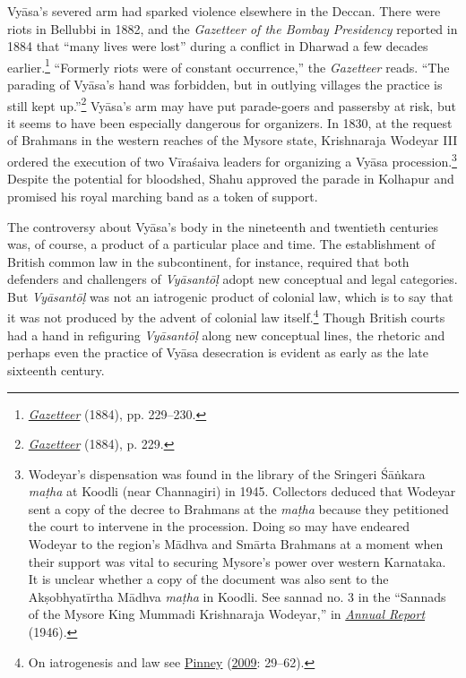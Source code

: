 Vyāsa’s severed arm had sparked violence elsewhere in the Deccan. There were riots in Bellubbi in 1882, and the \emph{Gazetteer of the Bombay Presidency} reported in 1884 that “many lives were lost” during a conflict in Dharwad a few decades earlier.\footnote{%
\hyperref[Gazetteer]{\emph{Gazetteer}} (1884), pp. 229–230.
}
 “Formerly riots were of constant occurrence,” the \emph{Gazetteer} reads. “The parading of Vyāsa’s hand was forbidden, but in outlying villages the practice is still kept up.”\footnote{%
\hyperref[Gazetteer]{\emph{Gazetteer}} (1884), p. 229.
}
 Vyāsa’s arm may have put parade-goers and passersby at risk, but it seems to have been especially dangerous for organizers. In 1830, at the request of Brahmans in the western reaches of the Mysore state, Krishnaraja Wodeyar III ordered the execution of two Vīraśaiva leaders for organizing a Vyāsa procession.\footnote{%
Wodeyar’s dispensation was found in the library of the Sringeri Śāṅkara \emph{maṭha} at Koodli (near Channagiri) in 1945. Collectors deduced that Wodeyar sent a copy of the decree to Brahmans at the \emph{maṭha} because they petitioned the court to intervene in the procession. Doing so may have endeared Wodeyar to the region’s Mādhva and Smārta Brahmans at a moment when their support was vital to securing Mysore’s power over western Karnataka. It is unclear whether a copy of the document was also sent to the Akṣobhyatīrtha Mādhva \emph{maṭha} in Koodli. See sannad no. 3 in the “Sannads of the Mysore King Mummadi Krishnaraja Wodeyar,” in \hyperref[ARMAD]{\emph{Annual Report}} (1946).
}
 Despite the potential for bloodshed, Shahu approved the parade in Kolhapur and promised his royal marching band as a token of support.


The controversy about Vyāsa’s body in the nineteenth and twentieth centuries was, of course, a product of a particular place and time. The establishment of British common law in the subcontinent, for instance, required that both defenders and challengers of \emph{Vyāsantōḷ} adopt new conceptual and legal categories. But \emph{Vyāsantōḷ} was not an iatrogenic product of colonial law, which is to say that it was not produced by the advent of colonial law itself.\footnote{%
On iatrogenesis and law see \hyperref[Pinney2009]{Pinney} (\hyperref[Pinney2009]{2009}: 29–62).
}
 Though British courts had a hand in refiguring \emph{Vyāsantōḷ} along new conceptual lines, the rhetoric and perhaps even the practice of Vyāsa desecration is evident as early as the late sixteenth century.


